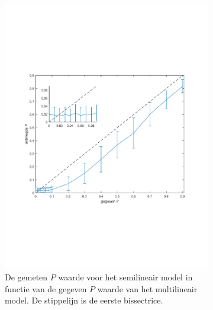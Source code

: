 \documentclass[12pt]{report}
\begin{document}
\begin{figure}
\begin{subfigure}[b]{0.5\textwidth}
\includegraphics[width=\textwidth,trim=0 200 0 175 cm]{PMC_AAM_10_100_PP.pdf}
\caption{De gemeten $P$ waarde voor het semilineair model in functie van de gegeven $P$ waarde van het multilineair model. De stippelijn is de eerste bissectrice.\label{fig:APP} }
\end{subfigure}
\begin{subfigure}[b]{0.5\textwidth}

\end{subfigure}
\end{figure}
\end{document}
